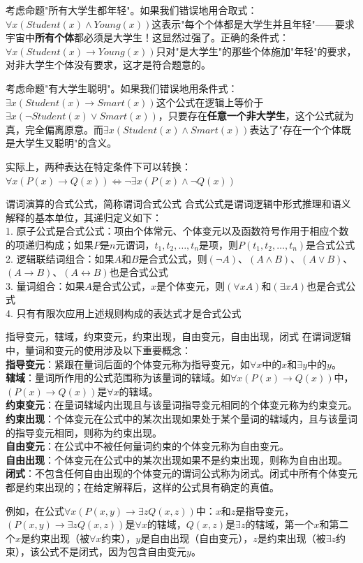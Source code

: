 \documentclass[lang=cn,11pt]{elegantbook}
\begin{document}
考虑命题"所有大学生都年轻"。如果我们错误地用合取式：$\forall x (Student(x) \land Young(x))$这表示"每个个体都是大学生并且年轻"——要求宇宙中\textbf{所有个体}都必须是大学生！这显然过强了。正确的条件式：$\forall x (Student(x) \rightarrow Young(x))$只对"是大学生"的那些个体施加"年轻"的要求，对非大学生个体没有要求，这才是符合题意的。

考虑命题"有大学生聪明"。如果我们错误地用条件式：$\exists x (Student(x) \rightarrow Smart(x))$这个公式在逻辑上等价于$\exists x (\neg Student(x) \lor Smart(x))$，只要存在\textbf{任意一个非大学生}，这个公式就为真，完全偏离原意。而$\exists x (Student(x) \land Smart(x))$表达了"存在一个个体既是大学生又聪明"的含义。

实际上，两种表达在特定条件下可以转换：$\forall x (P(x) \rightarrow Q(x)) \Leftrightarrow \neg \exists x (P(x) \land \neg Q(x))$
\begin{definition}{谓词演算的合式公式，简称谓词合式公式}
合式公式是谓词逻辑中形式推理和语义解释的基本单位，其递归定义如下：\\
1. 原子公式是合式公式：项由个体常元、个体变元以及函数符号作用于相应个数的项递归构成；如果$P$是$n$元谓词，$t_1, t_2, \ldots, t_n$是项，则$P(t_1, t_2, \ldots, t_n)$是合式公式\\
2. 逻辑联结词组合：如果$A$和$B$是合式公式，则$(\neg A)$、$(A \land B)$、$(A \lor B)$、$(A \rightarrow B)$、$(A \leftrightarrow B)$也是合式公式\\
3. 量词组合：如果$A$是合式公式，$x$是个体变元，则$(\forall x A)$和$(\exists x A)$也是合式公式\\
4. 只有有限次应用上述规则构成的表达式才是合式公式
\end{definition}
\begin{definition}{指导变元，辖域，约束变元，约束出现，自由变元，自由出现，闭式}
在谓词逻辑中，量词和变元的使用涉及以下重要概念：\\
\textbf{指导变元}：紧跟在量词后面的个体变元称为指导变元，如$\forall x$中的$x$和$\exists y$中的$y$。\\
\textbf{辖域}：量词所作用的公式范围称为该量词的辖域。如$\forall x (P(x) \rightarrow Q(x))$中，$(P(x) \rightarrow Q(x))$是$\forall x$的辖域。\\
\textbf{约束变元}：在量词辖域内出现且与该量词指导变元相同的个体变元称为约束变元。\\
\textbf{约束出现}：个体变元在公式中的某次出现如果处于某个量词的辖域内，且与该量词的指导变元相同，则称为约束出现。\\
\textbf{自由变元}：在公式中不被任何量词约束的个体变元称为自由变元。\\
\textbf{自由出现}：个体变元在公式中的某次出现如果不是约束出现，则称为自由出现。\\
\textbf{闭式}：不包含任何自由出现的个体变元的谓词公式称为闭式。闭式中所有个体变元都是约束出现的；在给定解释后，这样的公式具有确定的真值。
\end{definition}
例如，在公式$\forall x (P(x,y) \rightarrow \exists z Q(x,z))$中：$x$和$z$是指导变元，$(P(x,y) \rightarrow \exists z Q(x,z))$是$\forall x$的辖域，$Q(x,z)$是$\exists z$的辖域，第一个$x$和第二个$x$是约束出现（被$\forall x$约束），$y$是自由出现（自由变元），$z$是约束出现（被$\exists z$约束），该公式不是闭式，因为包含自由变元$y$。
\end{document}
